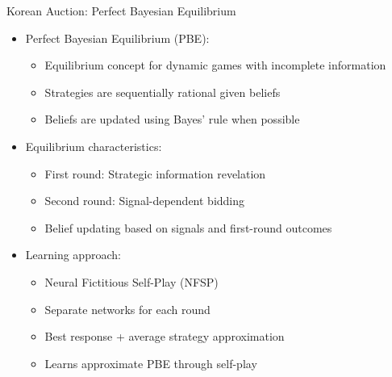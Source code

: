 \documentclass[10pt]{beamer}
\begin{document}
\begin{frame}{Korean Auction: Perfect Bayesian Equilibrium}
    \begin{itemize}
        \item Perfect Bayesian Equilibrium (PBE):
        \begin{itemize}
            \item Equilibrium concept for dynamic games with incomplete information
            \item Strategies are sequentially rational given beliefs
            \item Beliefs are updated using Bayes' rule when possible
        \end{itemize}
        \vspace{0.2cm}
        \item Equilibrium characteristics:
        \begin{itemize}
            \item First round: Strategic information revelation
            \item Second round: Signal-dependent bidding
            \item Belief updating based on signals and first-round outcomes
        \end{itemize}
        \vspace{0.2cm}
        \item Learning approach:
        \begin{itemize}
            \item Neural Fictitious Self-Play (NFSP)
            \item Separate networks for each round
            \item Best response + average strategy approximation
            \item Learns approximate PBE through self-play
        \end{itemize}
    \end{itemize}
\end{frame}

\end{document}
